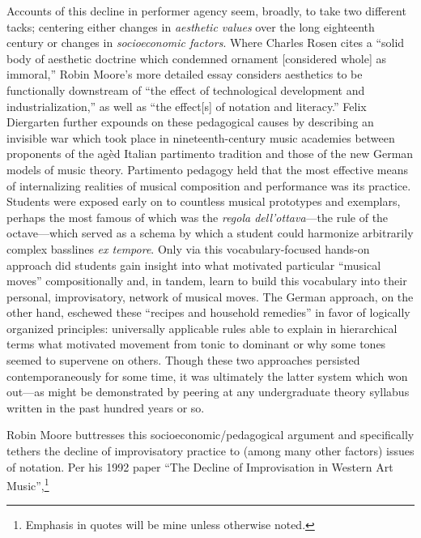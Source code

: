    Accounts of this decline in performer agency seem, broadly, to take two different tacks; centering either changes in \textit{aesthetic values} over the long eighteenth century or changes in \textit{socioeconomic factors}. Where Charles Rosen cites a ``solid body of aesthetic doctrine which condemned ornament [considered whole] as immoral,''\autocite[1198]{Rosen_1970} Robin Moore's more detailed essay considers aesthetics to be functionally downstream of ``the effect of technological development and industrialization,'' as well as ``the effect[s] of notation and literacy.''\autocite[80]{Moore_1992} Felix Diergarten further expounds on these pedagogical causes by describing an invisible war which took place in nineteenth-century music academies between proponents of the agèd Italian partimento tradition and those of the new German models of music theory.\autocite{Diergarten_2011} Partimento pedagogy held that the most effective means of internalizing realities of musical composition and performance was its practice. Students were exposed early on to countless musical prototypes and exemplars, perhaps the most famous of which was the \textit{regola dell'ottava}---the rule of the octave---which served as a schema by which a student could harmonize arbitrarily complex basslines \textit{ex tempore}. Only via this vocabulary-focused hands-on approach did students gain insight into what motivated particular ``musical moves'' compositionally and, in tandem, learn to build this vocabulary into their personal, improvisatory, network of musical moves. The German approach, on the other hand, eschewed these ``recipes and household remedies'' in favor of logically organized principles: universally applicable rules able to explain in hierarchical terms what motivated movement from tonic to dominant or why some tones seemed to supervene on others\autocite[9]{Diergarten_2011}. Though these two approaches persisted contemporaneously for some time, it was ultimately the latter system which won out---as might be demonstrated by peering at any undergraduate theory syllabus written in the past hundred years or so.

    Robin Moore buttresses this socioeconomic/pedagogical argument and specifically tethers the decline of improvisatory practice to (among many other factors) issues of notation. Per his 1992 paper ``The Decline of Improvisation in Western Art Music'',\footnote{Emphasis in quotes will be mine unless otherwise noted.}

